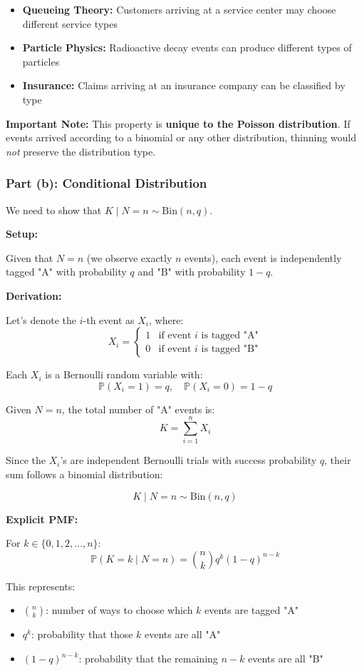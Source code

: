 \documentclass[12pt]{article}
\begin{document}
\begin{explanation}
\begin{itemize}
    \item \textbf{Queueing Theory:} Customers arriving at a service center may choose different service types

    \item \textbf{Particle Physics:} Radioactive decay events can produce different types of particles

    \item \textbf{Insurance:} Claims arriving at an insurance company can be classified by type
\end{itemize}

\textbf{Important Note:} This property is \textbf{unique to the Poisson distribution}. If events arrived according to a binomial or any other distribution, thinning would \textit{not} preserve the distribution type.
\end{explanation}

\subsubsection{Part (b): Conditional Distribution}

\begin{solution}
We need to show that \(K \mid N = n \sim \text{Bin}(n, q)\).

\textbf{Setup:}

Given that \(N = n\) (we observe exactly \(n\) events), each event is independently tagged "A" with probability \(q\) and "B" with probability \(1-q\).

\textbf{Derivation:}

Let's denote the \(i\)-th event as \(X_i\), where:
\[
X_i = \begin{cases}
1 & \text{if event } i \text{ is tagged "A"} \\
0 & \text{if event } i \text{ is tagged "B"}
\end{cases}
\]

Each \(X_i\) is a Bernoulli random variable with:
\[
\mathbb{P}(X_i = 1) = q, \quad \mathbb{P}(X_i = 0) = 1-q
\]

Given \(N = n\), the total number of "A" events is:
\[
K = \sum_{i=1}^{n} X_i
\]

Since the \(X_i\)'s are independent Bernoulli trials with success probability \(q\), their sum follows a binomial distribution:

\[
\boxed{K \mid N = n \sim \text{Bin}(n, q)}
\]

\textbf{Explicit PMF:}

For \(k \in \{0, 1, 2, \ldots, n\}\):
\[
\mathbb{P}(K = k \mid N = n) = \binom{n}{k} q^k (1-q)^{n-k}
\]

This represents:
\begin{itemize}
    \item \(\binom{n}{k}\): number of ways to choose which \(k\) events are tagged "A"
    \item \(q^k\): probability that those \(k\) events are all "A"
    \item \((1-q)^{n-k}\): probability that the remaining \(n-k\) events are all "B"
\end{itemize}
\end{solution}
\end{document}
